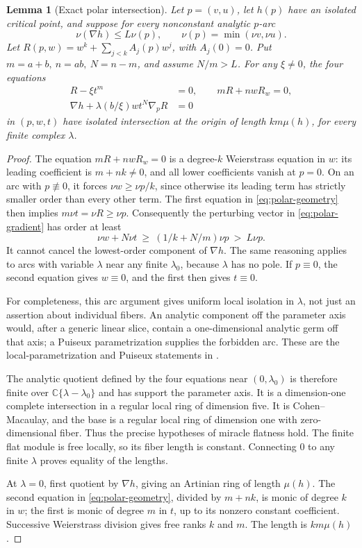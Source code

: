 \documentclass[11pt]{article}
\newtheorem{lemma}{Lemma}
\newcommand{\C}{\mathbb C}
\begin{document}
\begin{lemma}[Exact polar intersection]\label{lem:polar}
Let \(p=(v,u)\), let \(h(p)\) have an isolated critical point, and
suppose for every nonconstant analytic \(p\)-arc
\[
 \nu(\nabla h)\le L\nu(p),\qquad
 \nu(p)=\min(\nu v,\nu u).
\]
Let \(R(p,w)=w^k+\sum_{j<k}A_j(p)w^j\), with \(A_j(0)=0\).
Put \(m=a+b,\ n=ab,\ N=n-m\), and assume \(N/m>L\).
For any \(\xi\ne0\), the four equations
\begin{align}
 R-\xi t^m&=0,\qquad mR+nwR_w=0,\label{eq:polar-geometry}\\
 \nabla h+\lambda(b/\xi)wt^N\nabla_pR&=0\label{eq:polar-gradient}
\end{align}
in \((p,w,t)\) have isolated intersection at the origin of
length \(km\mu(h)\), for every finite complex \(\lambda\).
\end{lemma}
\begin{proof}
The equation \(mR+nwR_w=0\) is a degree-\(k\) Weierstrass
equation in \(w\): its leading coefficient is \(m+nk\ne0\),
and all lower coefficients vanish at \(p=0\).
On an arc with \(p\not\equiv0\), it forces
\(\nu w\ge\nu p/k\), since otherwise its leading term has
strictly smaller order than every other term.  The first equation
in \eqref{eq:polar-geometry} then implies
\(m\nu t=\nu R\ge\nu p\).  Consequently the perturbing vector
in \eqref{eq:polar-gradient} has order at least
\[
 \nu w+N\nu t\ \ge\ (1/k+N/m)\nu p\ >\ L\nu p .
\]
It cannot cancel the lowest-order component of \(\nabla h\).
The same reasoning applies to arcs with variable \(\lambda\)
near any finite \(\lambda_0\), because \(\lambda\) has no pole.
If \(p\equiv0\), the second equation gives \(w\equiv0\), and
the first then gives \(t\equiv0\).

For completeness, this arc argument gives uniform local isolation
in \(\lambda\), not just an assertion about individual fibers.
An analytic component off the parameter axis would, after a generic
linear slice, contain a one-dimensional analytic germ off that
axis; a Puiseux parametrization supplies the forbidden arc.
These are the local-parametrization and Puiseux statements
in \cite[Theorems 6.7.4 and 6.7.6]{lebl}.

The analytic quotient defined by the four equations near
\((0,\lambda_0)\) is therefore finite over
\(\C\{\lambda-\lambda_0\}\) and has support the parameter axis.
It is a dimension-one complete intersection in a regular local
ring of dimension five.  It is Cohen--Macaulay, and the base is a
regular local ring of dimension one with zero-dimensional fiber.
Thus the precise hypotheses of miracle flatness
\cite[Tag 00R4]{stacks} hold.  The finite flat module is free locally,
so its fiber length is constant.  Connecting \(0\) to any finite
\(\lambda\) proves equality of the lengths.

At \(\lambda=0\), first quotient by \(\nabla h\), giving an Artinian
ring of length \(\mu(h)\).  The second equation in
\eqref{eq:polar-geometry}, divided by \(m+nk\), is monic of degree
\(k\) in \(w\); the first is monic of degree \(m\) in \(t\), up
to its nonzero constant coefficient.  Successive Weierstrass
division gives free ranks \(k\) and \(m\).  The length is
\(km\mu(h)\).
\end{proof}
\end{document}
